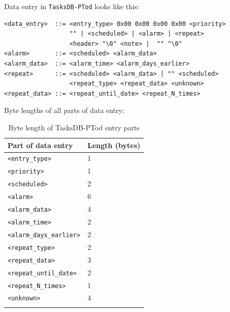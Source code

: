 \documentclass[a4paper,12pt,oneside]{scrartcl}
\begin{document}
Data entry in \texttt{TasksDB-PTod} looks like this:
\begin{verbatim}
<data_entry>  ::= <entry_type> 0x00 0x00 0x00 0x00 <priority>
                  "" | <scheduled> | <alarm> | <repeat>
                  <header> "\0" <note> |  "" "\0"
<alarm>       ::= <scheduled> <alarm_data>
<alarm_data>  ::= <alarm_time> <alarm_days_earlier>
<repeat>      ::= <scheduled> <alarm_data> | "" <scheduled>
                  <repeat_type> <repeat_data> <unknown>
<repeat_data> ::= <repeat_until_date> <repeat_N_times>
\end{verbatim}

Byte lengths of all parts of data entry:
\begin{longtable}[H]{|l|l|}
  \hline
  \textbf{Part of data entry} & \textbf{Length (bytes)} \\
  \hline
  \texttt{<entry\_type>} & 1 \\
  \hline
  \texttt{<priority>} & 1 \\
  \hline
  \texttt{<scheduled>} & 2 \\
  \hline
  \texttt{<alarm>} & 6 \\
  \texttt{<alarm\_data>} & 4 \\
  \texttt{<alarm\_time>} & 2 \\
  \texttt{<alarm\_days\_earlier>} & 2 \\
  \hline
  \texttt{<repeat\_type>} & 2 \\
  \texttt{<repeat\_data>} & 3 \\
  \texttt{<repeat\_until\_date>} & 2 \\
  \texttt{<repeat\_N\_times>} & 1 \\
  \texttt{<unknown>} & 4 \\
  \hline
  \caption{Byte length of TasksDB-PTod entry parts}
  \label{tab:tasks-ptod-entry-parts-lens}
\end{longtable}
\end{document}
